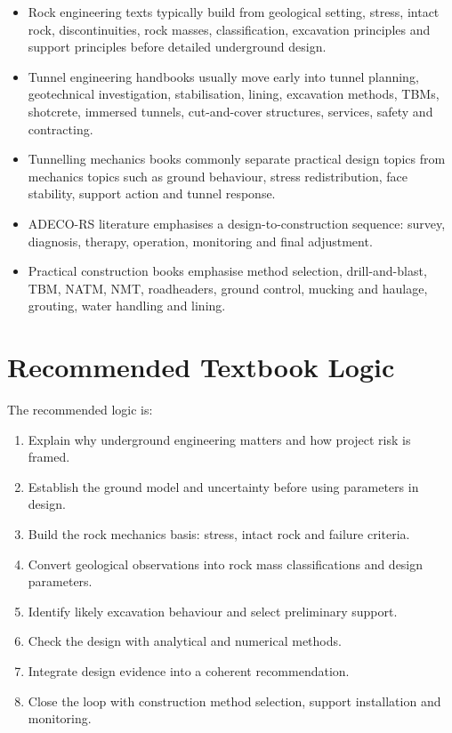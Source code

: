 \documentclass[12pt,oneside]{book}
\begin{document}
\begin{itemize}
    \item Rock engineering texts typically build from geological setting, stress, intact rock, discontinuities, rock masses, classification, excavation principles and support principles before detailed underground design.
    \item Tunnel engineering handbooks usually move early into tunnel planning, geotechnical investigation, stabilisation, lining, excavation methods, TBMs, shotcrete, immersed tunnels, cut-and-cover structures, services, safety and contracting.
    \item Tunnelling mechanics books commonly separate practical design topics from mechanics topics such as ground behaviour, stress redistribution, face stability, support action and tunnel response.
    \item ADECO-RS literature emphasises a design-to-construction sequence: survey, diagnosis, therapy, operation, monitoring and final adjustment.
    \item Practical construction books emphasise method selection, drill-and-blast, TBM, NATM, NMT, roadheaders, ground control, mucking and haulage, grouting, water handling and lining.
\end{itemize}

\section*{Recommended Textbook Logic}

The recommended logic is:

\begin{enumerate}
    \item Explain why underground engineering matters and how project risk is framed.
    \item Establish the ground model and uncertainty before using parameters in design.
    \item Build the rock mechanics basis: stress, intact rock and failure criteria.
    \item Convert geological observations into rock mass classifications and design parameters.
    \item Identify likely excavation behaviour and select preliminary support.
    \item Check the design with analytical and numerical methods.
    \item Integrate design evidence into a coherent recommendation.
    \item Close the loop with construction method selection, support installation and monitoring.
\end{enumerate}
\end{document}
